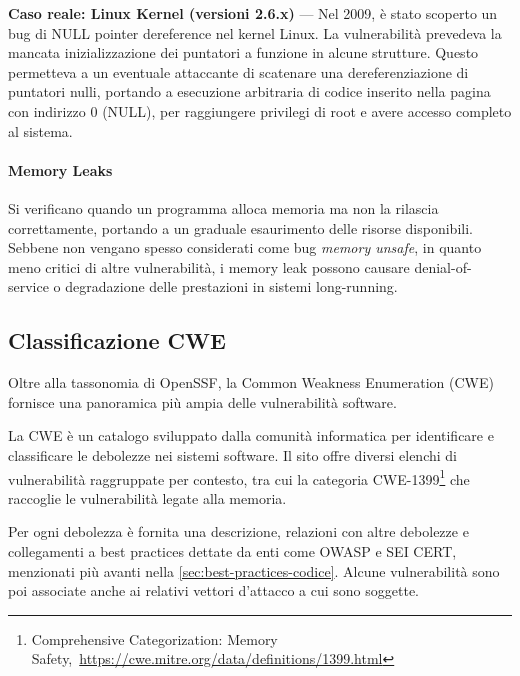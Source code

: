 \textbf{Caso reale: Linux Kernel (versioni 2.6.x)} — Nel 2009, è stato scoperto un
bug di NULL pointer dereference nel kernel Linux. La vulnerabilità prevedeva la
mancata inizializzazione dei puntatori a funzione in alcune strutture. Questo permetteva
a un eventuale attaccante di scatenare una dereferenziazione di puntatori nulli,
portando a esecuzione arbitraria di codice inserito nella pagina con indirizzo 0
(NULL), per raggiungere privilegi di root e avere accesso completo al sistema.\cite{null_pointer_dereference_linux}

\paragraph{Memory Leaks}
\label{sec:memory_leaks} Si verificano quando un programma alloca memoria ma non
la rilascia correttamente, portando a un graduale esaurimento delle risorse
disponibili. Sebbene non vengano spesso considerati come bug \textit{memory
unsafe}, in quanto meno critici di altre vulnerabilità, i memory leak possono
causare denial-of-service o degradazione delle prestazioni in sistemi long-running.


\subsection{Classificazione CWE}
Oltre alla tassonomia di OpenSSF, la Common Weakness Enumeration (CWE) fornisce
una panoramica più ampia delle vulnerabilità software.

La CWE è un catalogo sviluppato dalla comunità informatica per identificare e
classificare le debolezze nei sistemi software. Il sito offre diversi elenchi di
vulnerabilità raggruppate per contesto, tra cui la categoria CWE-1399\footnote{Comprehensive
Categorization: Memory Safety,~\url{https://cwe.mitre.org/data/definitions/1399.html}}
che raccoglie le vulnerabilità legate alla memoria.

Per ogni debolezza è fornita una descrizione, relazioni con altre debolezze e collegamenti
a best practices dettate da enti come OWASP e SEI CERT, menzionati più avanti
nella \autoref{sec:best-practices-codice}. Alcune vulnerabilità sono poi associate
anche ai relativi vettori d'attacco a cui sono soggette.

